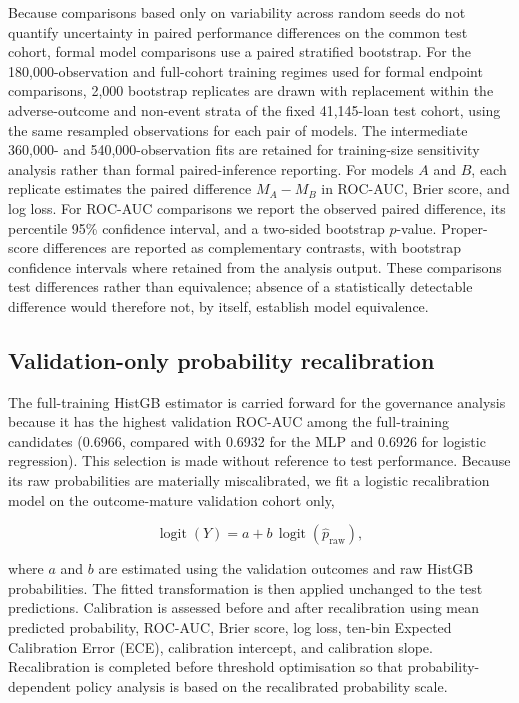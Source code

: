\documentclass[10pt]{article}
\begin{document}
Because comparisons based only on variability across random seeds do not quantify uncertainty in paired performance differences on the common test cohort, formal model comparisons use a paired stratified bootstrap. For the 180,000-observation and full-cohort training regimes used for formal endpoint comparisons, 2,000 bootstrap replicates are drawn with replacement within the adverse-outcome and non-event strata of the fixed 41,145-loan test cohort, using the same resampled observations for each pair of models. The intermediate 360,000- and 540,000-observation fits are retained for training-size sensitivity analysis rather than formal paired-inference reporting. For models $A$ and $B$, each replicate estimates the paired difference $M_A-M_B$ in ROC-AUC, Brier score, and log loss. For ROC-AUC comparisons we report the observed paired difference, its percentile 95\% confidence interval, and a two-sided bootstrap $p$-value. Proper-score differences are reported as complementary contrasts, with bootstrap confidence intervals where retained from the analysis output. These comparisons test differences rather than equivalence; absence of a statistically detectable difference would therefore not, by itself, establish model equivalence.


\subsection{Validation-only probability recalibration}

The full-training HistGB estimator is carried forward for the governance analysis because it has the highest validation ROC-AUC among the full-training candidates (0.6966, compared with 0.6932 for the MLP and 0.6926 for logistic regression). This selection is made without reference to test performance. Because its raw probabilities are materially miscalibrated, we fit a logistic recalibration model on the outcome-mature validation cohort only,

\[
\operatorname{logit}(Y)=a+b\,\operatorname{logit}(\hat p_{\mathrm{raw}}),
\]

where $a$ and $b$ are estimated using the validation outcomes and raw HistGB probabilities. The fitted transformation is then applied unchanged to the test predictions. Calibration is assessed before and after recalibration using mean predicted probability, ROC-AUC, Brier score, log loss, ten-bin Expected Calibration Error (ECE), calibration intercept, and calibration slope. Recalibration is completed before threshold optimisation so that probability-dependent policy analysis is based on the recalibrated probability scale.
\end{document}
